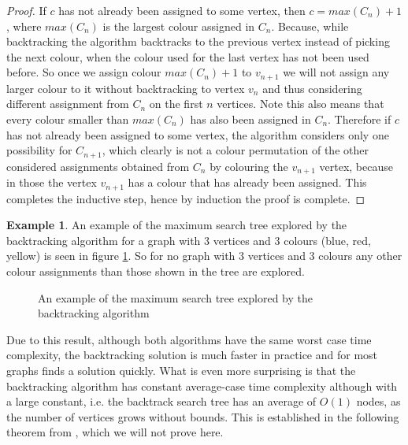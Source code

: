 \documentclass{report}
\theoremstyle{plain}
\theoremstyle{definition}
\newtheorem{example}{Example}
\theoremstyle{remark}
\numberwithin{definition}{chapter}
\numberwithin{example}{chapter}
\numberwithin{figure}{chapter}
\numberwithin{theorem}{chapter}
\numberwithin{lemma}{chapter}
\begin{document}
\begin{proof}
If $c$ has not already been assigned to some vertex, then $c=max(C_n)+1$, where $max(C_n)$ is the largest colour assigned in $C_n$. Because, while backtracking the algorithm backtracks to the previous vertex instead of picking the next colour, when the colour used for the last vertex has not been used before. So once we assign colour $max(C_n)+1$ to $v_{n+1}$ we will not assign any larger colour to it without backtracking to vertex $v_{n}$ and thus considering different assignment from $C_n$ on the first $n$ vertices. Note this also means that every colour smaller than $max(C_n)$ has also been assigned in $C_n$. Therefore if $c$ has not already been assigned to some vertex, the algorithm considers only one possibility for $C_{n+1}$, which clearly is not a colour permutation of the other considered assignments obtained from $C_n$ by colouring the $v_{n+1}$ vertex, because in those the vertex $v_{n+1}$ has a colour that has already been assigned. This completes the inductive step, hence by induction the proof is complete.
\end{proof}

\begin{example}
An example of the maximum search tree explored by the backtracking algorithm for a graph with 3 vertices and 3 colours (blue, red, yellow) is seen in figure \ref{bt_tree}. So for no graph with 3 vertices and 3 colours any other colour assignments than those shown in the tree are explored.

\begin{figure}

\center
{}
\label{bt_tree} 
\caption{An example of the maximum search tree explored by the backtracking algorithm}
\end{figure}
\end{example}

Due to this result, although both algorithms have the same worst case time complexity, the backtracking solution is much faster in practice and for most graphs finds a solution quickly. What is even more surprising is that the backtracking algorithm has constant average-case time complexity although with a large constant, i.e. the backtrack search tree has an average of $O(1)$ nodes, as the number of vertices grows without bounds. This is established in the following theorem from \cite{wilf1984backtrack}, which we will not prove here.
\end{document}
